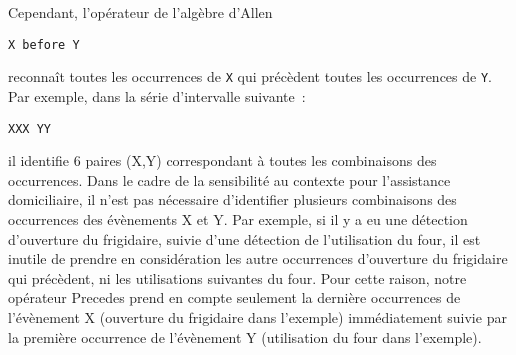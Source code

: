 Cependant, 
l'opérateur de l'algèbre d'Allen
\begin{lstlisting}
X before Y
\end{lstlisting}
reconnaît toutes les occurrences de {\tt X} qui précèdent toutes les
occurrences de {\tt Y}. Par exemple, dans la série d'intervalle
suivante~:
\begin{small}
\begin{Verbatim}[fontsize=\small] 
XXX YY
\end{Verbatim}
\end{small}
il identifie 6 paires (X,Y) correspondant à toutes les combinaisons
des occurrences.  Dans le cadre de la sensibilité au contexte pour
l'assistance domiciliaire, il n'est pas nécessaire d'identifier
plusieurs combinaisons des occurrences des évènements X et Y. Par
exemple, si il y a eu une détection d'ouverture du frigidaire, suivie
d'une détection de l'utilisation du four, il est inutile de prendre en
considération les autre occurrences d'ouverture du frigidaire qui
précèdent, ni les utilisations suivantes du four.  Pour cette raison,
notre opérateur Precedes prend en compte seulement la dernière
occurrences de l'évènement X (ouverture du frigidaire dans l'exemple)
immédiatement suivie par la première occurrence de l'évènement Y
(utilisation du four dans l'exemple).


